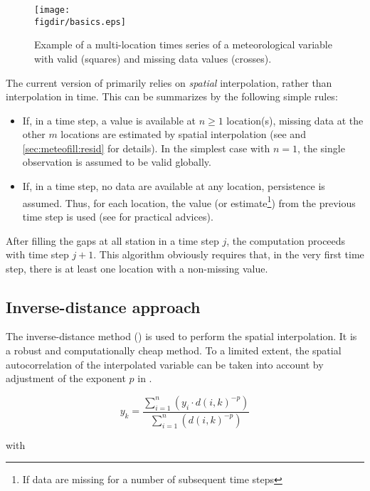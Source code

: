 \begin{figure}
  \centering
  \texttt{[image: \\figdir/basics.eps]}
  \caption{Example of a multi-location times series of a meteorological variable with valid (squares) and missing data values (crosses). \label{fig:meteofill:basics}}
\end{figure}

The current version of  primarily relies on \emph{spatial} interpolation, rather than interpolation in time. This can be summarizes by the following simple rules:
\begin{itemize}
  \item If, in a time step, a value is available at $n \geq 1$ location(s), missing data at the other $m$ locations are estimated by spatial interpolation (see  and \ref{sec:meteofill:resid} for details). In the simplest case with $n=1$, the single observation is assumed to be valid globally.
  \item If, in a time step, no data are available at any location, persistence is assumed. Thus, for each location, the value (or estimate\footnote{If data are missing for a number of subsequent time steps}) from the previous time step is used (see  for practical advices).
\end{itemize}

After filling the gaps at all station in a time step $j$, the computation proceeds with time step $j+1$. This algorithm obviously requires that, in the very first time step, there is at least one location with a non-missing value.

\subsection{Inverse-distance approach} \label{sec:meteofill:idw}
The inverse-distance method () is used to perform the spatial interpolation. It is a robust and computationally cheap method. To a limited extent, the spatial autocorrelation of the interpolated variable can be taken into account by adjustment of the exponent $p$ in .

\begin{equation}
y_k = \frac{\sum_{i=1}^{n} \left( y_i \cdot d(i,k)^{-p}\right)}{\sum_{i=1}^{n} \left( d(i,k)^{-p} \right)} \label{eqn:meteofill:idw}
\end{equation}

with

